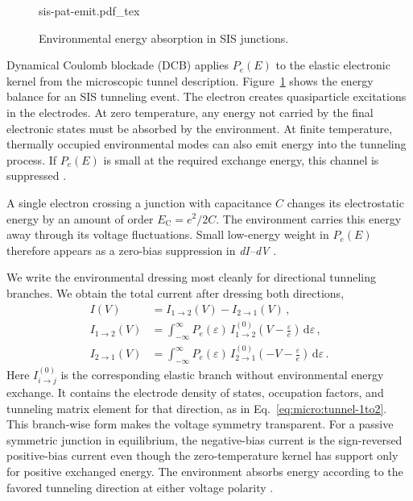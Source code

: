         \begin{figure}
            \captionsetup{format=plain}%
            \centering
            {sis-pat-emit.pdf_tex}
            \caption{Environmental energy absorption in SIS junctions.}
            \label{fig:stochastic:dcb-schematic}
        \end{figure}
        Dynamical Coulomb blockade (DCB) applies $P_e(E)$ to the elastic electronic kernel from the microscopic tunnel description. Figure~\ref{fig:stochastic:dcb-schematic} shows the energy balance for an SIS tunneling event. The electron creates quasiparticle excitations in the electrodes. At zero temperature, any energy not carried by the final electronic states must be absorbed by the environment. At finite temperature, thermally occupied environmental modes can also emit energy into the tunneling process. If $P_e(E)$ is small at the required exchange energy, this channel is suppressed \cite{falci_quasiparticle_1991,ingold_charge_1992}.

        A single electron crossing a junction with capacitance $C$ changes its electrostatic energy by an amount of order $E_\mathrm{C}=e^2/2C$. The environment carries this energy away through its voltage fluctuations. Small low-energy weight in $P_e(E)$ therefore appears as a zero-bias suppression in \textit{dI--dV} \cite{falci_quasiparticle_1991,ingold_charge_1992}.

        We write the environmental dressing most cleanly for directional tunneling branches. We obtain the total current after dressing both directions,
        \begin{align}
            I(V) &= I_{1\to 2}(V) - I_{2\to 1}(V)\,,\\
            I_{1\to 2}(V) &= \int_{-\infty}^{\infty} P_e(\varepsilon)\, I_{1\to 2}^{(0)}\!\left(V - \frac{\varepsilon}{e}\right)\,\mathrm{d}\varepsilon\,,\\
            I_{2\to 1}(V) &= \int_{-\infty}^{\infty} P_e(\varepsilon)\, I_{2\to 1}^{(0)}\!\left(-V - \frac{\varepsilon}{e}\right)\,\mathrm{d}\varepsilon\,.
        \end{align}
        Here $I_{i\to j}^{(0)}$ is the corresponding elastic branch without environmental energy exchange. It contains the electrode density of states, occupation factors, and tunneling matrix element for that direction, as in Eq.~\eqref{eq:micro:tunnel-1to2}. This branch-wise form makes the voltage symmetry transparent. For a passive symmetric junction in equilibrium, the negative-bias current is the sign-reversed positive-bias current even though the zero-temperature kernel has support only for positive exchanged energy. The environment absorbs energy according to the favored tunneling direction at either voltage polarity \cite{falci_quasiparticle_1991,ingold_charge_1992}.

